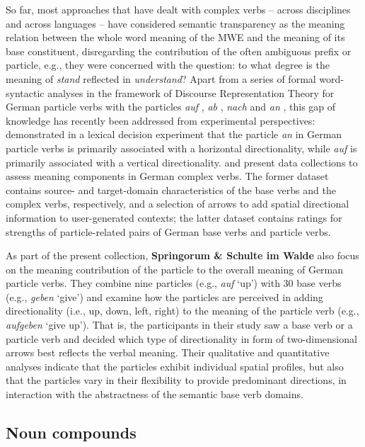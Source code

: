 \documentclass[output=paper]{langsci/langscibook}
\begin{document}
So far, most approaches that have dealt with complex verbs -- across
disciplines and across languages -- have considered semantic
transparency as the meaning relation between the whole word meaning of
the MWE and the meaning of its base constituent, disregarding the
contribution of the often ambiguous prefix or particle, e.g., they
were concerned with the question: to what degree is the meaning of
\textit{stand} reflected in \textit{understand}? Apart from a series
of formal word-syntactic analyses in the framework of
Discourse Representation Theory \citep{Kamp/Reyle:93} for
German particle verbs with the particles \textit{auf}
\citep{Lechler/Rossdeutscher:09}, \textit{ab} \citep{Kliche:11}, \textit{nach}
\citep{Haselbach:11} and 
\textit{an} \citep{Springorum:11}, this gap of knowledge has recently been
addressed from experimental perspectives: \cite{FrassinelliEtAl:17}
demonstrated in a lexical decision experiment that the particle
\textit{an} in German particle verbs is primarily associated with a
horizontal directionality, while \textit{auf} is primarily associated
with a vertical directionality. \citet{SchulteImWaldeEtAl:18} and
\citet{Koeper/SchulteImWalde:18} present data collections to assess
meaning components in German complex verbs. The former dataset
contains source- and target-domain characteristics of the base verbs
and the complex verbs, respectively, and a selection of arrows to add
spatial directional information to user-generated contexts; the latter
dataset contains ratings for strengths of particle-related pairs of
German base verbs and particle verbs.

As part of the present collection, \textbf{Springorum \& Schulte im
  Walde} also focus on the meaning contribution of the particle to the
overall meaning of German particle verbs. They combine nine particles
(e.g., \textit{auf} `up') with 30 base verbs (e.g., \textit{geben}
`give') and examine how the particles are perceived in adding
directionality (i.e., up, down, left, right) to the meaning of the
particle verb (e.g., \textit{aufgeben} `give up'). That is, the
participants in their study saw a base verb or a particle verb and
decided which type of directionality in form of two-dimensional arrows
best reflects the verbal meaning. Their qualitative and quantitative
analyses indicate that the particles exhibit individual spatial
profiles, but also that the particles vary in their flexibility to
provide predominant directions, in interaction with the abstractness
of the semantic base verb domains.


\subsection{Noun compounds}
\label{sec:compounds}
\end{document}
